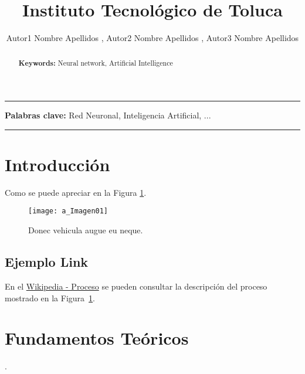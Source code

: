 \documentclass[12pt]{article}
\title{Instituto Tecnológico de Toluca}
\author{
  Autor1 Nombre Apellidos  \inst{1}, 
  Autor2 Nombre Apellidos  \inst{2}, 
  Autor3 Nombre Apellidos   \inst{1}
}
\begin{document}
 

\maketitle
\thispagestyle{firststyle}
\hrule

\begin{resumen} 			%
  \lipsum[1]	    		         %
 
  \textbf{Palabras clave:} Red Neuronal, Inteligencia Artificial, ...
\end{resumen}

\begin{abstract}				 %
  \lipsum[1]
  
  \textbf{Keywords:}  Neural network, Artificial Intelligence
\end{abstract}
\hrule

\section{Introducción}

\lipsum[1-2] 
Como se puede apreciar en la Figura \ref{fig:01_Proceso}.

\begin{figure}[htbp]                                                      %
\centering
\texttt{[image: a\_Imagen01]}
\caption{Donec vehicula augue eu neque.}
\label{fig:01_Proceso}
\end{figure}

\subsection{Ejemplo Link}
\lipsum[1]
En el \href{https://es.wikipedia.org/wiki/Proceso_(ingenier%C3%ADa)}{Wikipedia - Proceso} se pueden consultar la descripción
del proceso mostrado en la Figura~\ref{fig:01_Proceso}. 


\section{Fundamentos Teóricos}
\lipsum[1].
\end{document}
